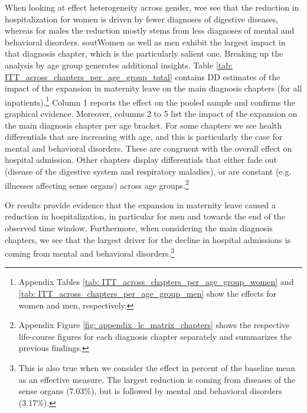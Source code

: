 \documentclass[11pt, a4paper]{article} %
\begin{document}
When looking at effect heterogeneity across gender, wee see that the reduction in hospitalization for women is driven by fewer diagnoses of digestive diseases, whereas for males the reduction mostly stems from less diagnoses of mental and behavioral disorders. sout{Women as well as men exhibit the largest impact in that diagnosis chapter, which is the particularly salient one.} \newline
Breaking up the analysis by age group generates additional insights. Table \ref{tab: ITT_across_chapters_per_age_group_total} contains DD estimates of the impact of the expansion in maternity leave on the main diagnosis chapters (for all inpatients).\footnote{Appendix Tables \ref{tab: ITT_across_chapters_per_age_group_women} and \ref{tab: ITT_across_chapters_per_age_group_men} show the effects for women and men, respectively.} Column 1 reports the effect on the pooled sample and confirms the graphical evidence. Moreover, columns 2 to 5 list the impact of the expansion on the main diagnosis chapter per age bracket. For some chapters we see health differentials that are increasing with age, and this is particularly the case for mental and behavioral disorders. These are congruent with the overall effect on hospital admission. Other chapters display differentials that either fade out (disease of the digestive system and respiratory maladies), or are constant (e.g. illnesses affecting sense organs) across age groups.\footnote{Appendix Figure \ref{fig: appendix_lc_matrix_chapters} shows the respective life-course figures for each diagnosis chapter separately and summarizes the previous findings.}\newline 

Or results provide evidence that the expansion in maternity leave caused a reduction in hospitalization, in particular for men and towards the end of the observed time window. Furthermore, when considering the main diagnosis chapters, we see that the largest driver for the decline in hospital admissions is coming from mental and behavioral disorders.\footnote{This is also true when we consider the effect in percent of the baseline mean as an effective measure. The largest reduction is coming from diseases of the sense organs (7.03\%), but is followed by mental and behavioral disorders (3.17\%).} 

\bigskip
\end{document}
